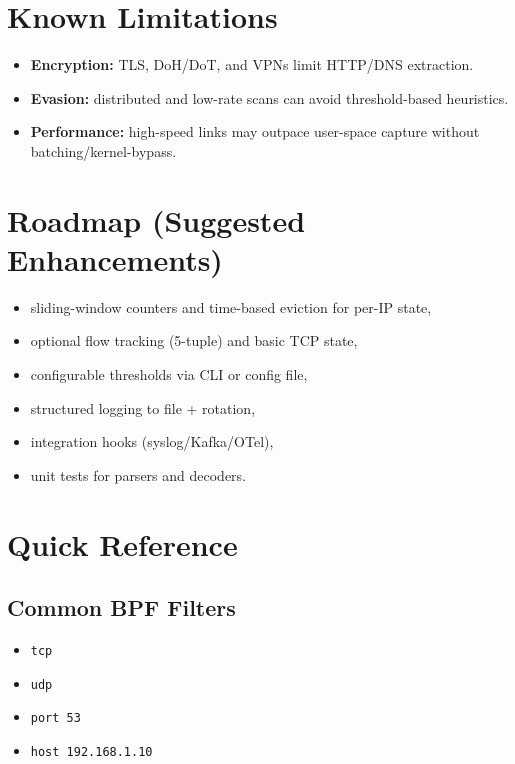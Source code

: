\documentclass[14pt]{extarticle}
\begin{document}
\section{Known Limitations}
\begin{itemize}
  \item \textbf{Encryption:} TLS, DoH/DoT, and VPNs limit HTTP/DNS extraction.
  \item \textbf{Evasion:} distributed and low-rate scans can avoid threshold-based heuristics.
  \item \textbf{Performance:} high-speed links may outpace user-space capture without batching/kernel-bypass.
\end{itemize}

\section{Roadmap (Suggested Enhancements)}
\begin{itemize}
  \item sliding-window counters and time-based eviction for per-IP state,
  \item optional flow tracking (5-tuple) and basic TCP state,
  \item configurable thresholds via CLI or config file,
  \item structured logging to file + rotation,
  \item integration hooks (syslog/Kafka/OTel),
  \item unit tests for parsers and decoders.
\end{itemize}

\appendix
\section{Quick Reference}
\subsection{Common BPF Filters}
\begin{itemize}
  \item \texttt{tcp}
  \item \texttt{udp}
  \item \texttt{port 53}
  \item \texttt{host 192.168.1.10}
\end{itemize}



\end{document}
